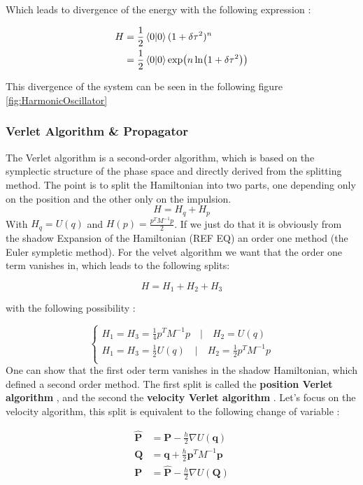 \documentclass[ansiapaper]{report}
\begin{document}
\begin{multicols}{3}
	Which leads to divergence of the energy with the following expression :

	\begin{align*}
		H & = \frac{1}{2}\braket{0}{0}(1 + \delta \tau^2)^n          \\
		  & = \frac{1}{2}\braket{0}{0}\exp(n \ln(1 + \delta \tau^2))
		\\
	\end{align*}

	This divergence of the system can be seen in the following figure \cref{fig:HarmonicOscillator}

	\subsubsection{Verlet Algorithm \& Propagator}

	The Verlet algorithm is a second-order algorithm, which is based on the symplectic structure of the phase space and directly derived from the splitting method. The point is to split the Hamiltonian into two parts, one depending only on the position and the other only on the impulsion. $$H = H_q + H_p$$ With $H_q = U(q)$ and $H(p) = \frac{p^TM^{-1}p}{2}$. If we just do that it is obviously from the shadow Expansion of the Hamiltonian (REF EQ) an order one method (the Euler sympletic method). For the velvet algorithm we want that the order one term vanishes in, which leads to the following splits:

	$$H = H_1 + H_2 + H_3$$

	with the following possibility :

	$$\begin{cases*}
			H_1 = H_3 = \frac{1}{4}p^TM^{-1}p \quad|\quad H_2 = U(q)             \\
			H_1 = H_3 = \frac{1}{2}U(q) \quad|\quad  H_2 = \frac{1}{2}p^TM^{-1}p \\
		\end{cases*}
	$$
	One can show that the first oder term vanishes in the shadow Hamiltonian, which defined a second order method. The first split is called the \textbf{position Verlet algorithm} , and the second the \textbf{velocity Verlet algorithm} . Let's focus on the velocity algorithm, this split is equivalent to the following change of variable :

	\begin{align}
		\hat{\textbf{P} } & = \textbf{P}  - \frac{h}{2} \nabla U(\textbf{q} )         \\
		\textbf{Q}        & = \textbf{q}  +  \frac{h}{2}\textbf{p} ^TM^{-1}\textbf{p} \\
		\textbf{P}        & = \hat{\textbf{P} } - \frac{h}{2} \nabla U(\textbf{Q} )
	\end{align}


\end{multicols}
\end{document}
